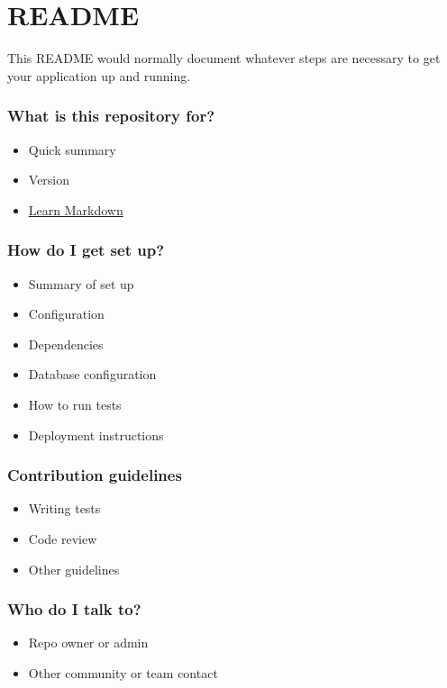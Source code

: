 \documentclass[]{article}
\author{}
\date{}
\begin{document}
\section{README}\label{readme}

This README would normally document whatever steps are necessary to get
your application up and running.

\subsubsection{What is this repository
for?}\label{what-is-this-repository-for}

\begin{itemize}
\itemsep1pt\parskip0pt
\item
  Quick summary
\item
  Version
\item
  \href{https://bitbucket.org/tutorials/markdowndemo}{Learn Markdown}
\end{itemize}

\subsubsection{How do I get set up?}\label{how-do-i-get-set-up}

\begin{itemize}
\itemsep1pt\parskip0pt
\item
  Summary of set up
\item
  Configuration
\item
  Dependencies
\item
  Database configuration
\item
  How to run tests
\item
  Deployment instructions
\end{itemize}

\subsubsection{Contribution guidelines}\label{contribution-guidelines}

\begin{itemize}
\itemsep1pt\parskip0pt
\item
  Writing tests
\item
  Code review
\item
  Other guidelines
\end{itemize}

\subsubsection{Who do I talk to?}\label{who-do-i-talk-to}

\begin{itemize}
\itemsep1pt\parskip0pt
\item
  Repo owner or admin
\item
  Other community or team contact
\end{itemize}
\end{document}
